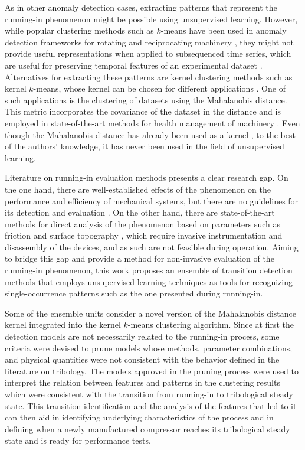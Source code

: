 \documentclass[preprint,11pt,number]{elsarticle}
\begin{document}
As in other anomaly detection cases, extracting patterns that represent the running-in phenomenon might be possible using unsupervised learning. However, while popular clustering methods such as $k$-means have been used in anomaly detection frameworks for rotating and reciprocating machinery \cite{Li2020,Liu2022}, they might not provide useful representations when applied to subsequenced time series, which are useful for preserving temporal features of an experimental dataset \cite{Keogh2005}. Alternatives for extracting these patterns are kernel clustering methods such as kernel $k$-means, whose kernel can be chosen for different applications \cite{Zolhavarieh2014, Dhillon2004}. One of such applications is the clustering of datasets using the Mahalanobis distance. This metric incorporates the covariance of the dataset in the distance and is employed in state-of-the-art methods for health management of machinery \cite{Chen2024,Zhang2024}. Even though the Mahalanobis distance has already been used as a kernel \cite{Yao2021}, to the best of the authors' knowledge, it has never been used in the field of unsupervised learning.

Literature on running-in evaluation methods presents a clear research gap. On the one hand, there are well-established effects of the phenomenon on the performance and efficiency of mechanical systems, but there are no guidelines for its detection and evaluation \cite{Blau2005}. On the other hand, there are state-of-the-art methods for direct analysis of the phenomenon based on parameters such as friction and surface topography \cite{Argatov2023,Khonsari2021}, which require invasive instrumentation and disassembly of the devices, and as such are not feasible during operation. Aiming to bridge this gap and provide a method for non-invasive evaluation of the running-in phenomenon, this work proposes an ensemble of transition detection methods that employs unsupervised learning techniques as tools for recognizing single-occurrence patterns such as the one presented during running-in.


Some of the ensemble units consider a novel version of the Mahalanobis distance kernel integrated into the kernel $k$-means clustering algorithm. Since at first the detection models are not necessarily related to the running-in process, some criteria were devised to prune models whose methods, parameter combinations, and physical quantities were not consistent with the behavior defined in the literature on tribology. The models approved in the pruning process were used to interpret the relation between features and patterns in the clustering results which were consistent with the transition from running-in to tribological steady state. This transition identification and the analysis of the features that led to it can then aid in identifying underlying characteristics of the process and in defining when a newly manufactured compressor reaches its tribological steady state and is ready for performance tests.
\end{document}
